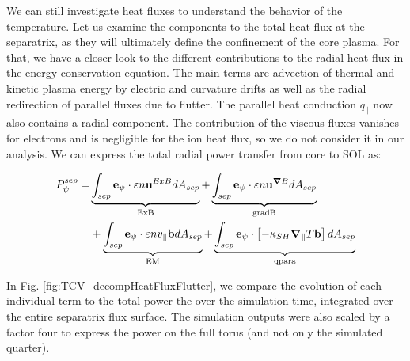 We can still investigate heat fluxes to understand the behavior of the temperature. Let us examine the components to the total heat flux at the separatrix, as they will ultimately define the confinement of the core plasma. For that, we have a closer look to the different contributions to the radial heat flux in the energy conservation equation. The main terms are advection of thermal and kinetic plasma energy by electric and curvature drifts as well as the radial redirection of parallel fluxes due to flutter. The parallel heat conduction $q_\parallel$ now also contains a radial component. The contribution of the viscous fluxes vanishes for electrons and is negligible for the ion heat flux, so we do not consider it in our analysis. We can express the total radial power transfer from core to SOL as: 

\begin{align}
	P_\psi^{sep} =& \underbrace{\int_{sep} \mathbf{e}_\psi \cdot \varepsilon n \mathbf{u}^{ExB} dA_{sep}}_{\text{ExB}} + \underbrace{\int_{sep} \mathbf{e}_\psi \cdot \varepsilon n \mathbf{u}^{\grad B} dA_{sep}}_{\text{gradB}} \nonumber\\
	& + \underbrace{\int_{sep} \mathbf{e}_\psi \cdot \varepsilon n v_\parallel \mathbf{b} dA_{sep}}_{\text{EM}} + \underbrace{\int_{sep} \mathbf{e}_\psi\cdot\left[-\kappa_{SH} \grad_\parallel T\mathbf{b}\right] dA_{sep}}_{\text{qpara}}
\end{align}

In Fig. \ref{fig:TCV_decompHeatFluxFlutter}, we compare the evolution of each individual term to the total power the over the simulation time, integrated over the entire separatrix flux surface. The simulation outputs were also scaled by a factor four to express the power on the full torus (and not only the simulated quarter).

